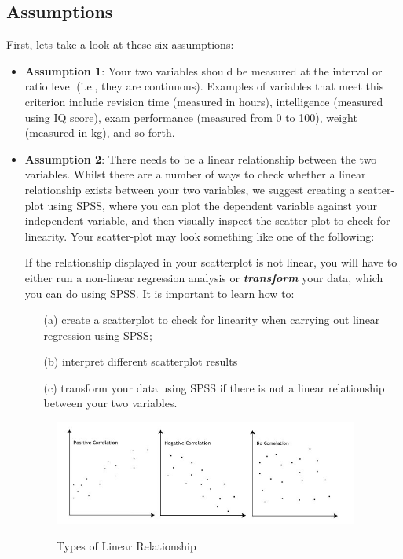 \documentclass[a4paper,12pt]{article}
\begin{document}
\subsection*{Assumptions}
First, lets take a look at these six assumptions:
\begin{itemize}
\item \textbf{Assumption 1}: Your two variables should be measured at the interval or ratio level (i.e., they are continuous). Examples of variables that meet this criterion include revision time (measured in hours), intelligence (measured using IQ score), exam performance (measured from 0 to 100), weight (measured in kg), and so forth.

\item \textbf{Assumption 2}: There needs to be a linear relationship between the two variables. Whilst there are a number of ways to check whether a linear relationship exists between your two variables, we suggest creating a scatter-plot using SPSS, where you can plot the dependent variable against your independent variable, and then visually inspect the scatter-plot to check for linearity. Your scatter-plot may look something like one of the following:

If the relationship displayed in your scatterplot is not linear, you will have to either run a non-linear regression analysis or \textbf{\textit{transform}} your data, which you can do using SPSS. It is important to learn how to: \begin{itemize}
\item[(a)] create a scatterplot to check for linearity when carrying out linear regression using SPSS; \item[(b)] interpret different scatterplot results \item[(c)] transform your data using SPSS if there is not a linear relationship between your two variables.
\end{itemize}

\begin{figure}[h!]
\begin{centering}
  \includegraphics[width=10cm]{images/Regre1.jpg}\\
  \caption{Types of Linear Relationship}
\end{centering}
\end{figure}


\end{itemize}
\end{document}
